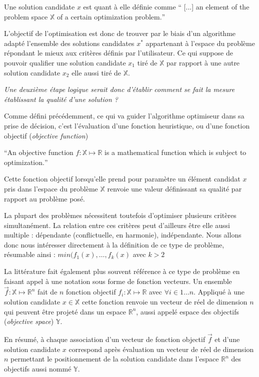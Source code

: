 Une solution candidate $x$ est quant à elle définie comme \foreignquote{english}{ [...] an element of the problem space $ \mathbb{X}$ of a certain optimization problem.}

L'objectif de l'optimisation est donc de trouver par le biais d'un algorithme adapté l'ensemble des solutions candidates $x^*$ appartenant à l'espace du problème répondant le mieux aux critères définis par l'utilisateur. Ce qui suppose de pouvoir qualifier une solution candidate $x_1$ tiré de $\mathbb{X}$ par rapport à une autre solution candidate $x_2$ elle aussi tiré de $\mathbb{X}$.

\textit{Une deuxième étape logique serait donc d'établir comment se fait la mesure établissant la qualité d'une solution ?}

Comme défini précédemment, ce qui va guider l'algorithme optimiseur dans sa prise de décision, c'est l'évaluation d'une fonction heuristique, ou d'une fonction objectif (\textit{objective function})  

\foreignquote{english}{An objective function $f: \mathbb{X} \mapsto \mathbb{R}$ is a mathematical function which is subject to optimization.}

Cette fonction objectif lorsqu'elle prend pour paramètre un élément candidat $x$ pris dans l'espace du problème $ \mathbb{X}$ renvoie une valeur définissant sa qualité par rapport au problème posé. \autocite[44]{Weise2011}

\sloppy La plupart des problèmes nécessitent toutefois d'optimiser plusieurs critères simultanément. La relation entre ces critères peut d'ailleurs être elle aussi multiple : dépendante (conflictuelle, en harmonie), indépendante. Nous allons donc nous intéresser directement à la définition de ce type de problème, résumable ainsi :  $min(f_1(x), \dotsc, f_k(x)$ avec $k > 2$

La littérature fait également plus souvent référence à ce type de problème en faisant appel à une notation sous forme de fonction vecteurs. Un ensemble $\vec{f} : \mathbb{X} \mapsto \mathbb{R}^n$ fait de $n$ fonction objectif $f_i : \mathbb{X} \mapsto \mathbb{R}$ avec $\forall i \in 1 \dotsc n$. Appliqué à une solution candidate $x \in \mathbb{X}$ cette fonction renvoie un vecteur de réel de dimension $n$ qui peuvent être projeté dans un espace $\mathbb{R}^n$, aussi appelé espace des objectifs (\textit{objective space}) $\mathbb{Y}$.

En résumé, à chaque association d'un vecteur de fonction objectif $\vec{f}$ et d'une solution candidate $x$ correspond après évaluation un vecteur de réel de dimension $n$ permettant le positionnement de la solution candidate dans l'espace $\mathbb{R}^n$ des objectifs aussi nommé $\mathbb{Y}$.

